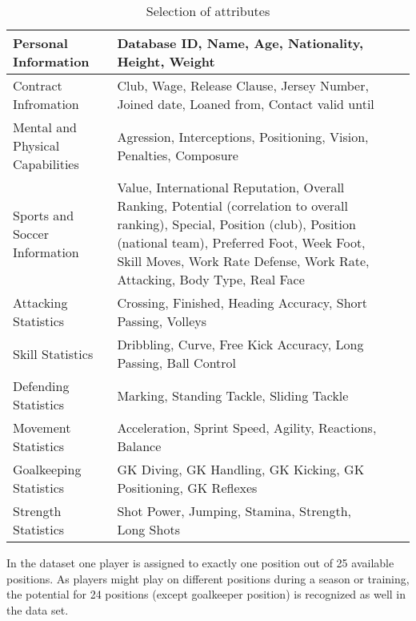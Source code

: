\documentclass[runningheads]{llncs}
\begin{document}
\begin{table}[H]
\begin{tabular}{p{3.5cm}|p{8.5cm}l|l}
\hline 
Personal Information & Database ID,  Name, Age, Nationality, Height, Weight\\ 
\hline 
Contract Infromation &  Club, Wage, Release Clause, Jersey Number, Joined date, Loaned from, Contact valid until \\
\hline 
 Mental and Physical Capabilities & Agression, Interceptions, Positioning, Vision, Penalties, Composure\\
\hline
Sports and Soccer Information & Value, International Reputation, Overall Ranking, Potential (correlation to overall ranking), Special, Position (club), Position (national team), Preferred Foot, Week Foot, Skill Moves, Work Rate Defense, Work Rate, Attacking, Body Type,  Real Face \\
\hline
Attacking Statistics & Crossing, Finished, Heading Accuracy, Short Passing, Volleys \\
\hline
Skill Statistics & Dribbling, Curve, Free Kick Accuracy, Long Passing, Ball Control\\
\hline
Defending Statistics & Marking, Standing Tackle, Sliding Tackle\\
\hline
Movement Statistics & Acceleration, Sprint Speed, Agility, Reactions, Balance \\
\hline
Goalkeeping Statistics & GK Diving, GK Handling, GK Kicking, GK Positioning, GK Reflexes\\
\hline
Strength Statistics &  Shot Power, Jumping, Stamina, Strength, Long Shots\\
\hline
\end{tabular}
\label{tab:SelectionOfAttributes}
\caption{Selection of attributes}
\end{table}
In the dataset one player is assigned to exactly one position out of 25 available positions. As players might play on different positions during a season or training, the potential for 24 positions (except goalkeeper position) is recognized as well in the data set. %
\end{document}
